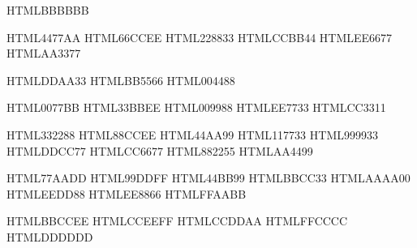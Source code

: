 \definecolor{TolGray}      {HTML}{BBBBBB}

\definecolor{TolBriBlue}   {HTML}{4477AA}
\definecolor{TolBriCyan}   {HTML}{66CCEE}
\definecolor{TolBriGreen}  {HTML}{228833}
\definecolor{TolBriYellow} {HTML}{CCBB44}
\definecolor{TolBriRed}    {HTML}{EE6677}
\definecolor{TolBriPurple} {HTML}{AA3377}

\definecolor{TolHCYellow}  {HTML}{DDAA33}
\definecolor{TolHCRed}     {HTML}{BB5566}
\definecolor{TolHCBlue}    {HTML}{004488}

\definecolor{TolVibBlue}   {HTML}{0077BB}
\definecolor{TolVibCyan}   {HTML}{33BBEE}
\definecolor{TolVibTeal}   {HTML}{009988}
\definecolor{TolVibOrange} {HTML}{EE7733}
\definecolor{TolVibRed}    {HTML}{CC3311}

\definecolor{TolMutIndigo} {HTML}{332288}
\definecolor{TolMutCyan}   {HTML}{88CCEE}
\definecolor{TolMutTeal}   {HTML}{44AA99}
\definecolor{TolMutGreen}  {HTML}{117733}
\definecolor{TolMutOlive}  {HTML}{999933}
\definecolor{TolMutSand}   {HTML}{DDCC77}
\definecolor{TolMutRose}   {HTML}{CC6677}
\definecolor{TolMutWine}   {HTML}{882255}
\definecolor{TolMutPurple} {HTML}{AA4499}

\definecolor{TolLigBlue}   {HTML}{77AADD}
\definecolor{TolLigCyan}   {HTML}{99DDFF}
\definecolor{TolLigMint}   {HTML}{44BB99}
\definecolor{TolLigPear}   {HTML}{BBCC33}
\definecolor{TolLigOlive}  {HTML}{AAAA00}
\definecolor{TolLigYellow} {HTML}{EEDD88}
\definecolor{TolLigOrange} {HTML}{EE8866}
\definecolor{TolLigPink}   {HTML}{FFAABB}

\definecolor{TolPaleBlue}  {HTML}{BBCCEE}
\definecolor{TolPaleCyan}  {HTML}{CCEEFF}
\definecolor{TolPaleGreen} {HTML}{CCDDAA}
\definecolor{TolPaleRed}   {HTML}{FFCCCC}
\definecolor{TolPaleGray}  {HTML}{DDDDDD}
